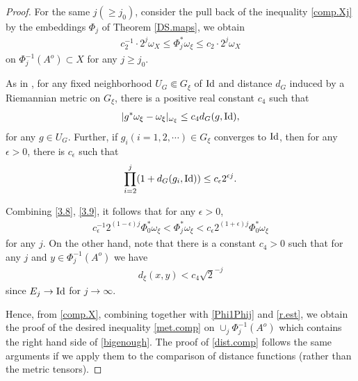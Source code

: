 \documentclass[12pt,a4paper]{amsart}
\theoremstyle{remark}
\theoremstyle{definition}
\begin{document}
\begin{proof}
For the same $j(\ge j_0)$, consider the pull back 
of the inequality \eqref{comp.Xj} by 
the embeddings $\Phi_j$ of Theorem \eqref{DS.maps}, 
we obtain 
\begin{align}\label{comp.X}
    c_2^{-1}\cdot 2^j \omega_X
\le \Phi_j^* \omega_\xi\le c_2\cdot 2^j \omega_X
\end{align} 
on $\Phi_j^{-1}(A^o)\subset X$ for any $j\ge j_0$. 










As in \cite[(3.8)]{SZ}, 
for any fixed neighborhood $U_G\Subset G_\xi$ of ${\rm Id}$ 
and distance $d_G$ induced by a Riemannian metric on $G_\xi$, 
there is a positive real constant $c_4$ such that 
\begin{align}\label{3.8}
|g^* \omega_\xi-\omega_\xi|_{\omega_\xi}
\le c_4 d_G(g,{\rm Id}), 
\end{align}
for any $g\in U_G$. 
Further, if $g_i (i=1,2,\cdots) \in G_\xi$ 
converges to ${\rm Id}$, then 
for any $\epsilon>0$, there is $c_\epsilon$ such that 
\begin{align}\label{3.9}
\prod_{i=2}^j(1+d_G(g_i,{\rm Id}))
\le c_{\epsilon}2^{\epsilon j}. 
\end{align}

Combining \eqref{3.8}, \eqref{3.9}, 
it follows that for any $\epsilon>0$, 
\begin{align}\label{Phi1Phij}
c_{\epsilon}^{-1}2^{(1-\epsilon) j}\Phi_0^* \omega_{\xi}
<\Phi_j^* \omega_{\xi}
<c_{\epsilon}2^{(1+\epsilon) j}\Phi_0^* \omega_{\xi}
\end{align}
for any $j$. 
On the other hand, note that there is a constant $c_4>0$ such that 
for any $j$ and $y\in \Phi_j^{-1}(A^o)$ we have 
\begin{align}\label{r.est}
d_{\xi}(x,y)<c_4 \sqrt{2}^{-j}
\end{align}
since $E_j\to {\rm Id}$ for $j\to \infty$. 

Hence, from \eqref{comp.X}, combining together with 
\eqref{Phi1Phij} and \eqref{r.est},  
we obtain the proof of the desired inequality 
\eqref{met.comp} 
on $\cup_j \Phi_j^{-1}(A^o)$ which contains 
the right hand side of \eqref{bigenough}. 
The proof of \eqref{dist.comp} follows the same arguments 
if we apply them to the comparison of distance functions (rather than 
the metric tensors). 
\end{proof}
\end{document}
